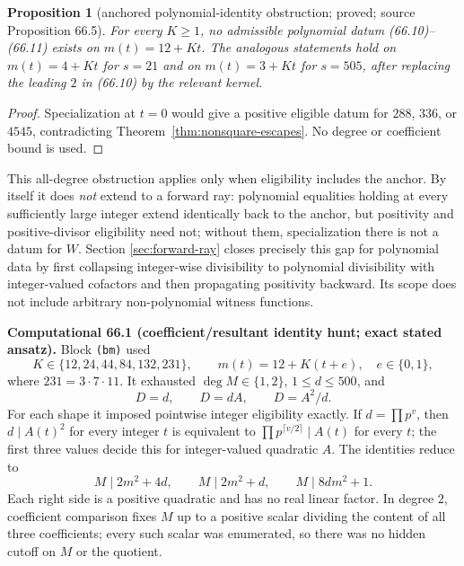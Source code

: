 \documentclass[10pt,reqno]{amsart}
\newtheorem{proposition}[theorem]{Proposition}
\theoremstyle{definition}
\newcommand{\1}{\mathbf 1}
\begin{document}
\begin{proposition}[anchored polynomial-identity obstruction; proved; source Proposition 66.5]
\label{prop:anchored-identity-wall}
For every $K\geq1$, no admissible polynomial datum (66.10)--(66.11) exists
on $m(t)=12+Kt$.  The analogous statements hold on $m(t)=4+Kt$ for $s=21$
and on $m(t)=3+Kt$ for $s=505$, after replacing the leading $2$ in
(66.10) by the relevant kernel.
\end{proposition}
\begin{proof}
Specialization at $t=0$ would give a positive eligible datum for $288$,
$336$, or $4545$, contradicting Theorem~\ref{thm:nonsquare-escapes}.  No
degree or coefficient bound is used.
\end{proof}
This all-degree obstruction applies only when eligibility includes the
anchor.  By itself it does \emph{not} extend to a forward ray: polynomial
equalities holding at every sufficiently large integer extend identically
back to the anchor, but positivity and positive-divisor eligibility need
not; without them, specialization there is not a datum for $W$.  Section
\ref{sec:forward-ray} closes precisely this gap for polynomial data by first
collapsing integer-wise divisibility to polynomial divisibility with
integer-valued cofactors and then propagating positivity backward.  Its
scope does not include arbitrary non-polynomial witness functions.

\medskip\noindent\textbf{Computational 66.1 (coefficient/resultant identity
hunt; exact stated ansatz).}
Block \texttt{(bm)} used
\begin{equation}\tag{66.12}
 K\in\{12,24,44,84,132,231\},\qquad
 m(t)=12+K(t+e),\quad e\in\{0,1\},
\end{equation}
where $231=3\cdot7\cdot11$.  It exhausted $\deg M\in\{1,2\}$,
$1\leq d\leq500$, and
\begin{equation}\tag{66.13}
                         D=d,\qquad D=dA,\qquad D=A^2/d.
\end{equation}
For each shape it imposed pointwise integer eligibility exactly.  If
$d=\prod p^v$, then $d\mid A(t)^2$ for every integer $t$ is equivalent to
$\prod p^{\lceil v/2\rceil}\mid A(t)$ for every $t$; the first three values
decide this for integer-valued quadratic $A$.  The identities reduce to
\begin{equation}\tag{66.14}
             M\mid2m^2+4d,\qquad M\mid2m^2+d,\qquad M\mid8dm^2+1.
\end{equation}
Each right side is a positive quadratic and has no real linear factor.  In
degree $2$, coefficient comparison fixes $M$ up to a positive scalar
dividing the content of all three coefficients; every such scalar was
enumerated, so there was no hidden cutoff on $M$ or the quotient.
\end{document}
